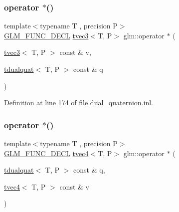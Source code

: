 \mbox{\label{group__gtx__dual__quaternion_ga025428539d309a905ce2faeec7a35639}} 
\subsubsection{\texorpdfstring{operator $\ast$()}{operator *()}\hspace{0.1cm}{\footnotesize\ttfamily [3/7]}}
{\footnotesize\ttfamily template$<$typename T , precision P$>$ \\
\mbox{\hyperlink{setup_8hpp_ab2d052de21a70539923e9bcbf6e83a51}{G\+L\+M\+\_\+\+F\+U\+N\+C\+\_\+\+D\+E\+CL}} \mbox{\hyperlink{structglm_1_1tvec3}{tvec3}}$<$T, P$>$ glm\+::operator $\ast$ (\begin{DoxyParamCaption}\item[{\mbox{\hyperlink{structglm_1_1tvec3}{tvec3}}$<$ T, P $>$ const \&}]{v,  }\item[{\mbox{\hyperlink{structglm_1_1tdualquat}{tdualquat}}$<$ T, P $>$ const \&}]{q }\end{DoxyParamCaption})}



Definition at line 174 of file dual\+\_\+quaternion.\+inl.

\mbox{\label{group__gtx__dual__quaternion_gaf32d1192c854e65c73fe7815e4177e8d}} 
\subsubsection{\texorpdfstring{operator $\ast$()}{operator *()}\hspace{0.1cm}{\footnotesize\ttfamily [4/7]}}
{\footnotesize\ttfamily template$<$typename T , precision P$>$ \\
\mbox{\hyperlink{setup_8hpp_ab2d052de21a70539923e9bcbf6e83a51}{G\+L\+M\+\_\+\+F\+U\+N\+C\+\_\+\+D\+E\+CL}} \mbox{\hyperlink{structglm_1_1tvec4}{tvec4}}$<$T, P$>$ glm\+::operator $\ast$ (\begin{DoxyParamCaption}\item[{\mbox{\hyperlink{structglm_1_1tdualquat}{tdualquat}}$<$ T, P $>$ const \&}]{q,  }\item[{\mbox{\hyperlink{structglm_1_1tvec4}{tvec4}}$<$ T, P $>$ const \&}]{v }\end{DoxyParamCaption})}



